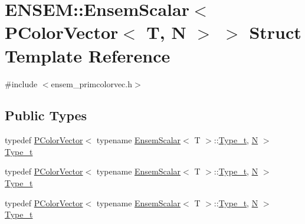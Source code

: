 \hypertarget{structENSEM_1_1EnsemScalar_3_01PColorVector_3_01T_00_01N_01_4_01_4}{}\section{E\+N\+S\+EM\+:\+:Ensem\+Scalar$<$ P\+Color\+Vector$<$ T, N $>$ $>$ Struct Template Reference}
\label{structENSEM_1_1EnsemScalar_3_01PColorVector_3_01T_00_01N_01_4_01_4}


{\ttfamily \#include $<$ensem\+\_\+primcolorvec.\+h$>$}

\subsection*{Public Types}
\begin{DoxyCompactItemize}
\item 
typedef \mbox{\hyperlink{classENSEM_1_1PColorVector}{P\+Color\+Vector}}$<$ typename \mbox{\hyperlink{structENSEM_1_1EnsemScalar}{Ensem\+Scalar}}$<$ T $>$\+::\mbox{\hyperlink{structENSEM_1_1EnsemScalar_3_01PColorVector_3_01T_00_01N_01_4_01_4_a7a37dbe2ba322ec20fb55d0359c3f149}{Type\+\_\+t}}, \mbox{\hyperlink{adat__devel_2lib_2hadron_2operator__name__util_8cc_a7722c8ecbb62d99aee7ce68b1752f337}{N}} $>$ \mbox{\hyperlink{structENSEM_1_1EnsemScalar_3_01PColorVector_3_01T_00_01N_01_4_01_4_a7a37dbe2ba322ec20fb55d0359c3f149}{Type\+\_\+t}}
\item 
typedef \mbox{\hyperlink{classENSEM_1_1PColorVector}{P\+Color\+Vector}}$<$ typename \mbox{\hyperlink{structENSEM_1_1EnsemScalar}{Ensem\+Scalar}}$<$ T $>$\+::\mbox{\hyperlink{structENSEM_1_1EnsemScalar_3_01PColorVector_3_01T_00_01N_01_4_01_4_a7a37dbe2ba322ec20fb55d0359c3f149}{Type\+\_\+t}}, \mbox{\hyperlink{adat__devel_2lib_2hadron_2operator__name__util_8cc_a7722c8ecbb62d99aee7ce68b1752f337}{N}} $>$ \mbox{\hyperlink{structENSEM_1_1EnsemScalar_3_01PColorVector_3_01T_00_01N_01_4_01_4_a7a37dbe2ba322ec20fb55d0359c3f149}{Type\+\_\+t}}
\item 
typedef \mbox{\hyperlink{classENSEM_1_1PColorVector}{P\+Color\+Vector}}$<$ typename \mbox{\hyperlink{structENSEM_1_1EnsemScalar}{Ensem\+Scalar}}$<$ T $>$\+::\mbox{\hyperlink{structENSEM_1_1EnsemScalar_3_01PColorVector_3_01T_00_01N_01_4_01_4_a7a37dbe2ba322ec20fb55d0359c3f149}{Type\+\_\+t}}, \mbox{\hyperlink{adat__devel_2lib_2hadron_2operator__name__util_8cc_a7722c8ecbb62d99aee7ce68b1752f337}{N}} $>$ \mbox{\hyperlink{structENSEM_1_1EnsemScalar_3_01PColorVector_3_01T_00_01N_01_4_01_4_a7a37dbe2ba322ec20fb55d0359c3f149}{Type\+\_\+t}}
\end{DoxyCompactItemize}


